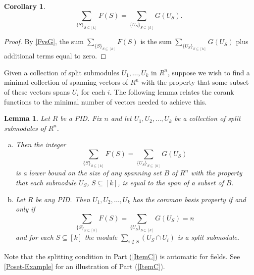 \documentclass[a4paper]{amsart}
\numberwithin{theoremcounter}{section}
\newtheorem{lemma}[lemmaauto]{Lemma}
\newtheorem{corollary}[corollaryauto]{Corollary}
\theoremstyle{definition}
\theoremstyle{remark}
\begin{document}
\begin{corollary} \label{SumF=SumG} $$  \sum_{\{S\}_{S \subseteq [k]}} F(S) =  \sum_{\{U_S\}_{S \subseteq [k]}} G(U_S). $$ 
\end{corollary} 

\begin{proof} By \autoref{FvsG}, the sum $  \sum_{\{S\}_{S \subseteq [k]}} F(S)$  is  the sum $\sum_{\{U_S\}_{S \subseteq [k]}} G(U_S)$ plus additional terms equal to zero. 
\end{proof} 


Given a collection of split submodules $U_1, \dots, U_k$ in $R^n$, suppose we wish to find a minimal collection of spanning vectors of $R^n$ with the property that some subset of these vectors spans $U_i$ for each $i$. The following lemma relates the corank functions to the minimal number of vectors needed to achieve this. 

\begin{lemma} \label{CorankCondition} Let $R$ be a PID. Fix $n$ and let $U_1, U_2, \dots, U_k$ be a collection of split submodules of $R^n$. 
\begin{enumerate}[(a)]
\item  \label{ItemA} Then the integer $$  \sum_{\{S\}_{S \subseteq [k]}} F(S) =  \sum_{\{U_S\}_{S \subseteq [k]}} G(U_S) $$ is a lower bound on the size of any spanning set $B$ of $R^n$  with the property that each submodule $U_S$, $S \subseteq [k]$, is equal to the span of a subset of $B$. 
\item  \label{ItemC} Let $R$ be any PID.   Then $U_1, U_2, \dots, U_k$ has the common basis property if and only if
$$  \sum_{\{S\}_{S \subseteq [k]}} F(S) =  \sum_{\{U_S\}_{S \subseteq [k]}} G(U_S) =n $$
and for each $S \subseteq [k]$ the module $\sum_{i \notin S} (U_S \cap U_i)$ is a split submodule.  
\end{enumerate}  
\end{lemma} 

Note that the splitting condition in  Part (\ref{ItemC}) is automatic for fields. See \autoref{Poset-Example} for an illustration of Part (\ref{ItemC}). 
\end{document}
